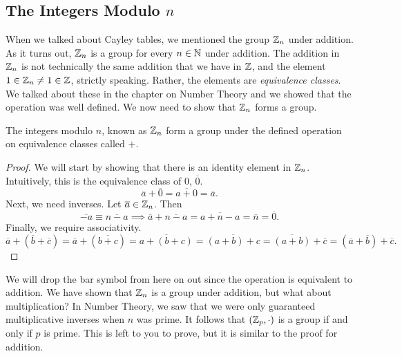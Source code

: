 \subsection*{The Integers Modulo $n$}
When we talked about Cayley tables, we mentioned the group $\mathbb{Z}_{n}$ under addition. As it turns out, $\mathbb{Z}_{n}$ is a group for every $n\in\mathbb{N}$ under addition. The addition in $\mathbb{Z}_{n}$ is not technically the same addition that we have in $\mathbb{Z}$, and the element $1\in\mathbb{Z}_{n}\neq 1\in\mathbb{Z}$, strictly speaking. Rather, the elements are \textit{equivalence classes}. We talked about these in the chapter on Number Theory and we showed that the operation was well defined.
We now need to show that $\mathbb{Z}_{n}$ forms a group.
\begin{theorem}{}
	The integers modulo $n$, known as $\mathbb{Z}_{n}$ form a group under the defined operation on equivalence classes called $+$.
\end{theorem}
\begin{proof}
	We will start by showing that there is an identity element in $\mathbb{Z}_{n}$. Intuitively, this is the equivalence class of 0, $\overline{0}$.
	\[
		\overline{a}+\overline{0}=\overline{a+0}=\overline{a}.
	\]
	Next, we need inverses. Let $\overline{a}\in\mathbb{Z}_{n}$. Then
	\[
		\overline{-a}\equiv\overline{n-a}\implies \overline{a}+\overline{n-a}=\overline{a+n-a}=\overline{n}=\overline{0}.
	\]
	Finally, we require associativity.
	\[
		\overline{a}+(\overline{b}+\overline{c})=\overline{a}+(\overline{b+c})
		=\overline{a+(b+c)}=\overline{(a+b)+c}=\overline{(a+b)}+\overline{c}=
		(\overline{a}+\overline{b})+\overline{c}.
	\]
\end{proof}
We will drop the bar symbol from here on out since the operation is equivalent to addition.
We have shown that $\mathbb{Z}_{n}$ is a group under addition, but what about multiplication? In Number Theory, we saw that we were only guaranteed multiplicative inverses when $n$ was prime. It follows that $(\mathbb{Z}_{p},\cdot)$ is a group if and only if $p$ is prime. This is left to you to prove, but it is similar to the proof for addition.

